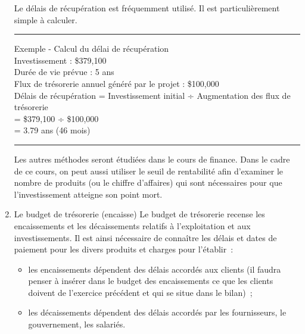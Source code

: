 \documentclass{tufte-handout}
\begin{document}
\begin{enumerate}
Le délais de récupération est fréquemment utilisé. Il est particulièrement simple à calculer.\\

\noindent\rule{\textwidth}{0.5pt}
Exemple - Calcul du délai de récupération\\
Investissement : \$379,100\\
Durée de vie prévue : 5  ans\\
Flux de trésorerie annuel généré par le projet : \$100,000\\
Délais de récupération = Investissement initial  ÷  Augmentation des flux de trésorerie\\
= \$379,100 ÷ \$100,000\\
= 3.79 ans (46 mois)\\

\noindent\rule{\textwidth}{0.5pt}

Les autres méthodes seront étudiées dans le cours de finance. Dans le cadre de ce cours, on peut aussi utiliser le seuil de rentabilité afin d'examiner le nombre de produits (ou le chiffre d'affaires) qui sont nécessaires pour que l'investissement atteigne son point mort.\\
\item Le budget de trésorerie (encaisse)
\label{sec:org74bc980}
Le budget de trésorerie recense les encaissements et les décaissements relatifs à l'exploitation et aux investissements. Il est ainsi nécessaire de connaître les délais et dates de paiement pour les divers produits et charges pour l'établir :\\
\begin{itemize}
\item les encaissements dépendent des délais accordés aux clients (il faudra penser à insérer dans le budget des encaissements ce que les clients doivent de l'exercice précédent et qui se situe dans le bilan) ;\\
\item les décaissements dépendent des délais accordés par les fournisseurs, le gouvernement, les salariés.\\
\end{itemize}


\end{enumerate}
\end{document}
